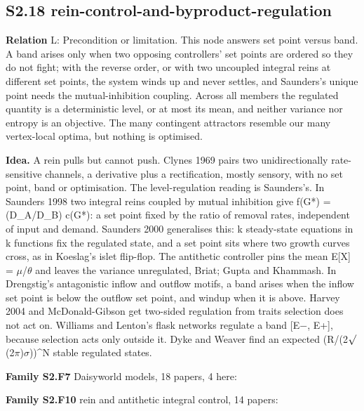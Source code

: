 \documentclass[10pt]{article}
\newcommand{\memb}[1]{\par\smallskip\textbf{#1}\quad}
\begin{document}
\subsection{S2.18 rein-control-and-byproduct-regulation}\label{node:S2-S2-18-rein-control-and-byproduct-regulation}
\textbf{Relation} \textsf{L}: Precondition or limitation. This node answers set point versus band. A band arises only when two opposing controllers' set points are ordered so they do not fight; with the reverse order, or with two uncoupled integral reins at different set points, the system winds up and never settles, and Saunders's unique point needs the mutual-inhibition coupling. Across all members the regulated quantity is a deterministic level, or at most its mean, and neither variance nor entropy is an objective. The many contingent attractors resemble our many vertex-local optima, but nothing is optimised.

\textbf{Idea.} A rein pulls but cannot push. Clynes 1969 pairs two unidirectionally rate-sensitive channels, a derivative plus a rectification, mostly sensory, with no set point, band or optimisation. The level-regulation reading is Saunders's. In Saunders 1998 two integral reins coupled by mutual inhibition give f(G*) = (D\_A/D\_B) c(G*): a set point fixed by the ratio of removal rates, independent of input and demand. Saunders 2000 generalises this: k steady-state equations in k functions fix the regulated state, and a set point sits where two growth curves cross, as in Koeslag's islet flip-flop. The antithetic controller pins the mean E[X] = \ensuremath{\mu}/\ensuremath{\theta} and leaves the variance unregulated, Briat; Gupta and Khammash. In Drengstig's antagonistic inflow and outflow motifs, a band arises when the inflow set point is below the outflow set point, and windup when it is above. Harvey 2004 and McDonald-Gibson get two-sided regulation from traits selection does not act on. Williams and Lenton's flask networks regulate a band [E\ensuremath{-}, E+], because selection acts only outside it. Dyke and Weaver find an expected (R/(2\ensuremath{\surd}(2\ensuremath{\pi})\ensuremath{\sigma}))\^{}N stable regulated states.

\memb{Family S2.F7} Daisyworld models, 18 papers, 4 here: {\footnotesize \citetext{\citealp{Harvey-homeostasis04}; \citealp{DykeHarvey-hysteresis05}; \citealp{Andrew-daisyworld11}; \citealp{Boyle-symbiotic11}}}

\memb{Family S2.F10} rein and antithetic integral control, 14 papers: {\footnotesize \citetext{\citealp{Clynes-cybernetic69}; \citealp{Koeslag-glucose97}; \citealp{Saunders-integral98}; \citealp{Saunders-integral00}; \citealp{Drengstig-basic12}; \citealp{Briat-antithetic16}; \citealp{Thorsen-antagonistic18}; \citealp{GuptaKhammash-antithetic19}; \citealp{Koeslag-chromogranins99}; \citealp{Koeslag-reappraisal03}; \citealp{AngMcMillen-physical13}; \citealp{Risvoll-variable17}; \citealp{BriatKhammash-structural22}; \citealp{Ruoff-flux25}}}
\end{document}
